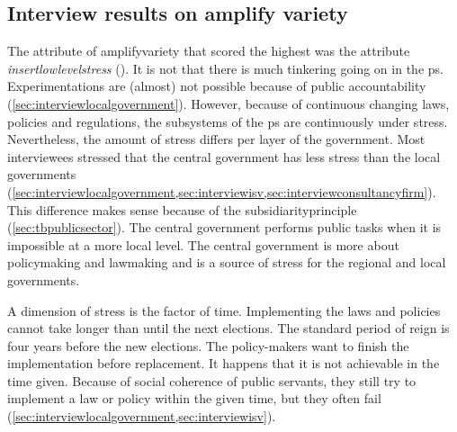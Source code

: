 \subsection{Interview results on amplify variety}
\label{sub:interviewresultsamplify}
The \gls{attribute} of \gls{amplifyvariety} that scored the highest was the \gls{attribute} \textit{\gls{insertlowlevelstress}} (). It is not that there is much tinkering going on in the \gls{ps}. Experimentations are (almost) not possible because of public accountability (\cref{sec:interviewlocalgovernment}). However, because of continuous changing laws, policies and regulations, the subsystems of the \gls{ps} are continuously under stress. Nevertheless, the amount of stress differs per layer of the government. Most interviewees stressed that the central government has less stress than the local governments (\cref{sec:interviewlocalgovernment,sec:interviewisv,sec:interviewconsultancyfirm}). This difference makes sense because of the \gls{subsidiarityprinciple} (\cref{sec:tbpublicsector}). The central government performs public tasks when it is impossible at a more local level. The central government is more about policymaking and lawmaking and is a source of stress for the regional and local governments. 

A dimension of stress is the factor of time. Implementing the laws and policies cannot take longer than until the next elections. The standard period of reign is four years before the new elections. The policy-makers want to finish the implementation before replacement. It happens that it is not achievable in the time given. Because of social coherence of public servants, they still try to implement a law or policy within the given time, but they often fail (\cref{sec:interviewlocalgovernment,sec:interviewisv}).

